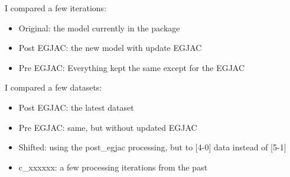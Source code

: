 \documentclass[12pt]{article}
\begin{document}
I compared a few iterations:
\begin{itemize}
\item Original: the model currently in the package
\item Post EGJAC: the new model with update EGJAC
\item Pre EGJAC: Everything kept the same except for the EGJAC
\end{itemize}
I compared a few datasets:
\begin{itemize}
\item Post EGJAC: the latest dataset
\item Pre EGJAC: same, but without updated EGJAC
\item Shifted: using the post\_egjac processing, but to [4-0] data instead of [5-1]
\item c\_xxxxxx: a few processing iterations from the past
\end{itemize}
\end{document}
